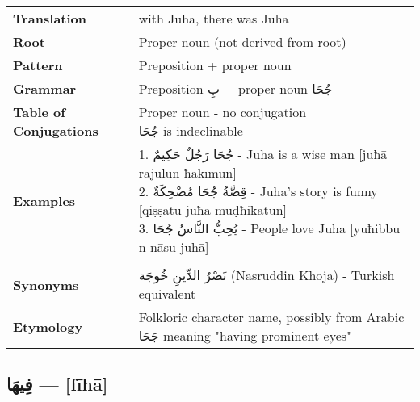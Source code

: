 \documentclass[letterpaper,12pt]{article}
\begin{document}
\begin{tabular}{p{3cm}p{10cm}}
\toprule
\textbf{Translation} & with Juha, there was Juha \\
\textbf{Root} & Proper noun (not derived from root) \\
\textbf{Pattern} & Preposition + proper noun \\
\textbf{Grammar} & Preposition \textarabic{بِ} + proper noun \textarabic{جُحَا} \\
\textbf{Table of Conjugations} & \makecell[l]{
Proper noun - no conjugation\\
\textarabic{جُحَا} is indeclinable
} \\
\textbf{Examples} & \makecell[l]{\parbox{9.5cm}{
1. \textarabic{جُحَا رَجُلٌ حَكِيمٌ} - Juha is a wise man [juħā rajulun ħakīmun]\\
2. \textarabic{قِصَّةُ جُحَا مُضْحِكَةٌ} - Juha's story is funny [qiṣṣatu juħā muḍħikatun]\\
3. \textarabic{يُحِبُّ النَّاسُ جُحَا} - People love Juha [yuħibbu n-nāsu juħā]
}} \\
\midrule \\
\textbf{Synonyms} & \textarabic{نَصْرُ الدِّينِ خُوجَة} (Nasruddin Khoja) - Turkish equivalent \\
\textbf{Etymology} & Folkloric character name, possibly from Arabic \textarabic{جَحَا} meaning "having prominent eyes" \\
\bottomrule
\end{tabular}

\subsection{\textarabic{فِيهَا} — [fīhā]}
\end{document}
